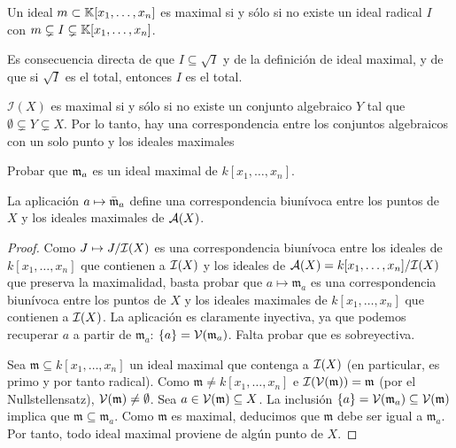 \documentclass[ACGA.tex]{subfiles}
\begin{document}
\begin{lemma}
Un ideal $m \subset \mathbb{K}[x_1,\dots,x_n]$ es maximal si y sólo si no existe un ideal radical $I$ con $m \subsetneq I \subsetneq \mathbb{K}[x_1,\dots,x_n]$.
\end{lemma}

\begin{dem}
Es consecuencia directa de que $I \subseteq \sqrt{I}$ y de la definición de ideal maximal, y de que si $\sqrt{I}$ es el total, entonces $I$ es el total.\QED
\end{dem}

\begin{teorema}
$\mathcal{I}(X)$ es maximal si y sólo si no existe un conjunto algebraico $Y$ tal que $\emptyset \subsetneq Y \subsetneq X$. Por lo tanto, hay una correspondencia entre los conjuntos algebraicos con un solo punto y los ideales maximales
\end{teorema}

\begin{ejer}
 Probar que ${\mathfrak{m}}_a$ es un ideal maximal de $k[x_1,\ldots,x_n]$.
\end{ejer}

\begin{prop}\label{maximal}
 La aplicación $a\mapsto \bar{{\mathfrak{m}}}_a$ define una correspondencia biunívoca entre los puntos de $X$ y los ideales maximales de $\mathcal{A}(X)$.
\end{prop}

\begin{proof}
 Como $J\mapsto J/\mathcal{I}(X)$ es una correspondencia biunívoca entre los ideales de $k[x_1,\ldots,x_n]$ que contienen a $\mathcal{I}(X)$ y los ideales de $\mathcal{A}(X)=k[x_1,\ldots,x_n]/\mathcal{I}(X)$ que preserva la maximalidad, basta probar que $a\mapsto{\mathfrak m}_a$ es una correspondencia biunívoca entre los puntos de $X$ y los ideales maximales de $k[x_1,\ldots,x_n]$ que contienen a $\mathcal{I}(X)$. La aplicación es claramente inyectiva, ya que podemos recuperar $a$ a partir de ${\mathfrak m}_a$: $\{a\}=\mathcal{V}({\mathfrak m}_a)$. Falta probar que es sobreyectiva.

 Sea ${\mathfrak m}\subseteq k[x_1,\ldots,x_n]$ un ideal maximal que contenga a $\mathcal{I}(X)$ (en particular, es primo y por tanto radical). Como ${\mathfrak m}\neq k[x_1,\ldots,x_n]$ e $\mathcal{I}(\mathcal{V}({\mathfrak m}))=\mathfrak m$ (por el Nullstellensatz), $\mathcal{V}({\mathfrak m})\neq\emptyset$. Sea $a\in \mathcal{V}({\mathfrak m})\subseteq X$. La inclusión $\{a\}=\mathcal{V}({\mathfrak m}_a)\subseteq \mathcal{V}({\mathfrak m})$ implica que ${\mathfrak m}\subseteq{\mathfrak m}_a$. Como ${\mathfrak m}$ es maximal, deducimos que ${\mathfrak m}$ debe ser igual a ${\mathfrak m}_a$. Por tanto, todo ideal maximal proviene de algún punto de $X$.
\end{proof}
\end{document}
